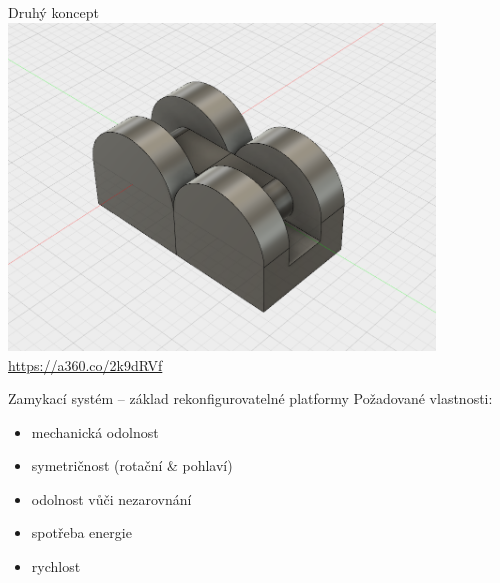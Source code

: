 \documentclass{beamer}
\begin{document}
\begin{frame}{Druhý koncept}
    \centering
    \includegraphics[width=0.85\textwidth]{img/mtranszfi}
    \url{https://a360.co/2k9dRVf}
\end{frame}

\begin{frame}{Zamykací systém -- základ rekonfigurovatelné platformy}
    Požadované vlastnosti:
    \begin{itemize}
        \item mechanická odolnost
        \item symetričnost (rotační \& pohlaví)
        \item odolnost vůči nezarovnání
        \item spotřeba energie
        \item rychlost
    \end{itemize}
\end{frame}
\end{document}
